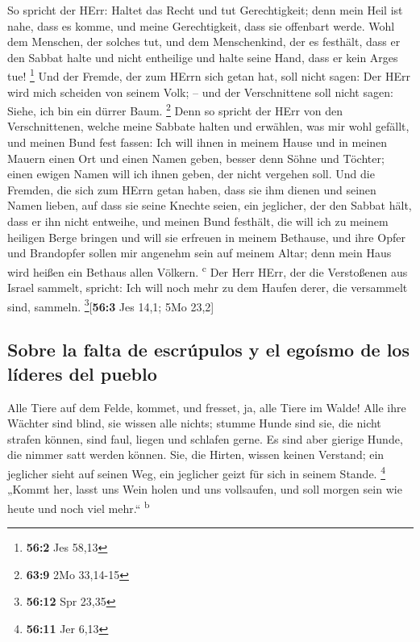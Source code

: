  So spricht der HErr: Haltet das Recht und tut
Gerechtigkeit; denn mein Heil ist nahe, dass es komme, und meine
Gerechtigkeit, dass sie offenbart werde.  Wohl dem
Menschen, der solches tut, und dem Menschenkind, der es festhält, dass
er den Sabbat halte und nicht entheilige und halte seine Hand, dass er
kein Arges tue! \footnote{\textbf{56:2} Jes 58,13}  Und
der Fremde, der zum HErrn sich getan hat, soll nicht sagen: Der HErr
wird mich scheiden von seinem Volk; -- und der Verschnittene soll nicht
sagen: Siehe, ich bin ein dürrer Baum. \footnote{\textbf{63:9} 2Mo
  33,14-15}  Denn so spricht der HErr von den
Verschnittenen, welche meine Sabbate halten und erwählen, was mir wohl
gefällt, und meinen Bund fest fassen:  Ich will ihnen in
meinem Hause und in meinen Mauern einen Ort und einen Namen geben,
besser denn Söhne und Töchter; einen ewigen Namen will ich ihnen geben,
der nicht vergehen soll.  Und die Fremden, die sich zum
HErrn getan haben, dass sie ihm dienen und seinen Namen lieben, auf dass
sie seine Knechte seien, ein jeglicher, der den Sabbat hält, dass er ihn
nicht entweihe, und meinen Bund festhält,  die will ich zu
meinem heiligen Berge bringen und will sie erfreuen in meinem Bethause,
und ihre Opfer und Brandopfer sollen mir angenehm sein auf meinem Altar;
denn mein Haus wird heißen ein Bethaus allen Völkern.
\textsuperscript{c}  Der Herr HErr, der die Verstoßenen
aus Israel sammelt, spricht: Ich will noch mehr zu dem Haufen derer, die
versammelt sind, sammeln. \footnote{\textbf{56:12} Spr 23,35}{[}\textbf{56:3}
Jes 14,1; 5Mo 23,2{]}

\hypertarget{sobre-la-falta-de-escruxfapulos-y-el-egouxedsmo-de-los-luxedderes-del-pueblo}{%
\subsection{Sobre la falta de escrúpulos y el egoísmo de los líderes del
pueblo}\label{sobre-la-falta-de-escruxfapulos-y-el-egouxedsmo-de-los-luxedderes-del-pueblo}}

 Alle Tiere auf dem Felde, kommet, und fresset, ja, alle
Tiere im Walde!  Alle ihre Wächter sind blind, sie wissen
alle nichts; stumme Hunde sind sie, die nicht strafen können, sind faul,
liegen und schlafen gerne.  Es sind aber gierige Hunde,
die nimmer satt werden können. Sie, die Hirten, wissen keinen Verstand;
ein jeglicher sieht auf seinen Weg, ein jeglicher geizt für sich in
seinem Stande. \footnote{\textbf{56:11} Jer 6,13}  „Kommt
her, lasst uns Wein holen und uns vollsaufen, und soll morgen sein wie
heute und noch viel mehr.`` \textsuperscript{b}

